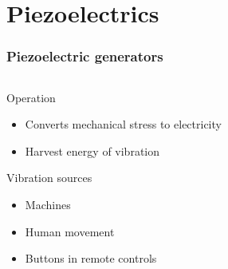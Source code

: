 \documentclass{beamer}
\begin{document}
\section{Piezoelectrics}

\begin{frame}
  \frametitle{Piezoelectric generators}

\begin{columns}
 \begin{column}{.5\textwidth}
  
\begin{block}{Operation}
\begin{itemize}
 \item Converts mechanical stress to electricity
 \item Harvest energy of vibration
\end{itemize}
\end{block}

\begin{block}{Vibration sources}
  \begin{itemize}
  \item Machines
  \item Human movement
  \item Buttons in remote controls
\end{itemize}
\end{block}

 \end{column}
\begin{column}{.4\textwidth}
  

\end{column}
\end{columns}
\end{frame}
\end{document}
